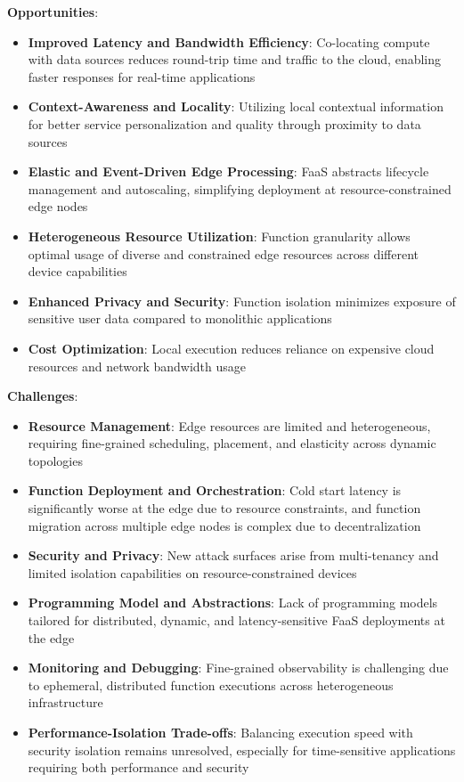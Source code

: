 \textbf{Opportunities}:
\begin{itemize}
    \item \textbf{Improved Latency and Bandwidth Efficiency}: Co-locating compute with data sources reduces round-trip time and traffic to the cloud, enabling faster responses for real-time applications
    \item \textbf{Context-Awareness and Locality}: Utilizing local contextual information for better service personalization and quality through proximity to data sources
    \item \textbf{Elastic and Event-Driven Edge Processing}: FaaS abstracts lifecycle management and autoscaling, simplifying deployment at resource-constrained edge nodes
    \item \textbf{Heterogeneous Resource Utilization}: Function granularity allows optimal usage of diverse and constrained edge resources across different device capabilities
    \item \textbf{Enhanced Privacy and Security}: Function isolation minimizes exposure of sensitive user data compared to monolithic applications
    \item \textbf{Cost Optimization}: Local execution reduces reliance on expensive cloud resources and network bandwidth usage
\end{itemize}

\textbf{Challenges}:
\begin{itemize}
    \item \textbf{Resource Management}: Edge resources are limited and heterogeneous, requiring fine-grained scheduling, placement, and elasticity across dynamic topologies
    \item \textbf{Function Deployment and Orchestration}: Cold start latency is significantly worse at the edge due to resource constraints, and function migration across multiple edge nodes is complex due to decentralization
    \item \textbf{Security and Privacy}: New attack surfaces arise from multi-tenancy and limited isolation capabilities on resource-constrained devices
    \item \textbf{Programming Model and Abstractions}: Lack of programming models tailored for distributed, dynamic, and latency-sensitive FaaS deployments at the edge
    \item \textbf{Monitoring and Debugging}: Fine-grained observability is challenging due to ephemeral, distributed function executions across heterogeneous infrastructure
    \item \textbf{Performance-Isolation Trade-offs}: Balancing execution speed with security isolation remains unresolved, especially for time-sensitive applications requiring both performance and security
\end{itemize}

